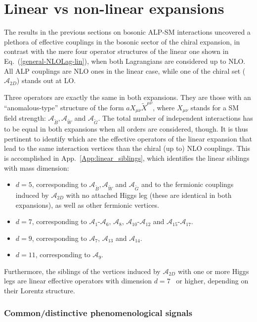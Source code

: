 \documentclass[11pt]{article}
\newcommand{\A}{\mathcal{A}}
\renewcommand{\[}{\begin{equation}}
\renewcommand{\]}{\end{equation}}
\begin{document}
\section{Linear vs non-linear expansions}
\label{linvsnonlin}
The results in the previous sections on bosonic ALP-SM interactions uncovered a plethora of effective couplings in the bosonic sector of the 
chiral expansion, in contrast with the mere four  operator structures  of the linear one shown in Eq.~(\ref{general-NLOLag-lin}), when both Lagrangians are considered up to NLO. 
All ALP couplings are NLO ones in the linear case, while one of the chiral set ($\A_{2D}$) stands out at LO.

Three operators are exactly the same in both expansions. They are those with an ``anomalous-type'' structure of the form  $a X_{\mu\nu} \tilde X^{\mu\nu}$,  where $X_{\mu\nu}$ stands for a SM field strength: $\A_{\tilde{B}}, \A_{\tilde{W}}$ and $\A_{\tilde{G}}$.  The total number of independent interactions has to be equal in both expansions when all orders are considered, though. It is thus pertinent to  identify which are the effective operators of the linear expansion that lead to the same  interaction vertices than the  
 chiral (up to) NLO couplings. This is accomplished in App.~\ref{App:linear_siblings}, which identifies the linear siblings with mass dimension: 
\begin{itemize}
\item  $d=5$, corresponding to $\A_{\tilde{B}}, \A_{\tilde{W}}$ and $\A_{\tilde{G}}$ and to the fermionic couplings induced by 
$\A_{2D}$ with no attached Higgs leg (these are identical in both expansions),  as well as other fermionic vertices.
\item $d=7$, corresponding to $\A_1$-$\A_6$, $\A_8$,  $\A_{10}$-$\A_{12}$ and  $\A_{15}$-$\A_{17}$.
\item $d=9$, corresponding to $\A_7$,   $\A_{13}$ and $\A_{14}$. \item $d=11$, corresponding to $\A_{9}$.
\end{itemize}
Furthermore, the  siblings of the vertices induced by $\A_{2D}$ with one or more Higgs legs are  linear effective operators with dimension $d=7$~\cite{Bauer:2016zfj} or 
 higher, depending on their Lorentz structure.
 
\subsubsection*{Common/distinctive phenomenological signals}
 
\end{document}

